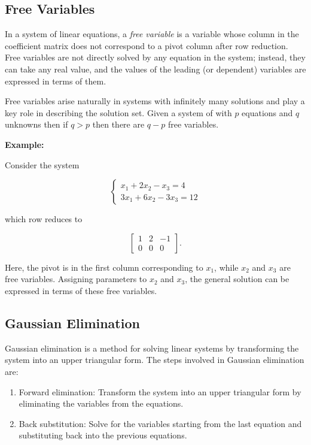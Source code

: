 \subsection{Free Variables}

In a system of linear equations, a \emph{free variable} is a variable whose column in the coefficient 
matrix does not correspond to a pivot column after row reduction. Free variables are not directly solved by 
any equation in the system; instead, they can take any real value, and the values of the leading 
(or dependent) variables are expressed in terms of them. 

Free variables arise naturally in systems with infinitely many solutions and play a key role in 
describing the solution set. Given a system of with \(p\) equations and \(q\) unknowns then if 
\(q > p\) then there are \(q - p\) free variables.

\textbf{Example:} 

Consider the system

\[
	\begin{cases}
	x_1 + 2x_2 - x_3 = 4 \\
	3x_1 + 6x_2 - 3x_3 = 12
	\end{cases}
\]

which row reduces to

\[
	\begin{bmatrix}
	1 & 2 & -1 \\
	0 & 0 & 0
	\end{bmatrix}.
\]

Here, the pivot is in the first column corresponding to \( x_1 \), while \( x_2 \) and \( x_3 \) are free 
variables. Assigning parameters to \( x_2 \) and \( x_3 \), the general solution can be expressed in terms 
of these free variables.

\subsection{Gaussian Elimination}

Gaussian elimination is a method for solving linear systems by transforming the system into an upper 
triangular form. The steps involved in Gaussian elimination are:

\begin{enumerate}
	
	\item Forward elimination: Transform the system into an upper triangular form by eliminating the 
	      variables from the equations.
	
		  \item Back substitution: Solve for the variables starting from the last equation and substituting 
	      back into the previous equations.

\end{enumerate}

